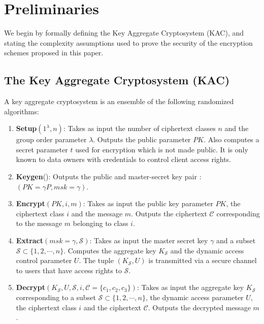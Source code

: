 \section{Preliminaries}
\label{sec:prelims}

We begin by formally defining the Key Aggregate Cryptosystem (KAC), and stating the complexity assumptions used to prove the security of the encryption schemes proposed in this paper.

\subsection{The Key Aggregate Cryptosystem (KAC)}
\label{subsec:KAC}

A key aggregate cryptosystem is an ensemble of the following randomized algorithms:

\begin{enumerate}
 \item \textbf{Setup}$(1^{\lambda},n)$: Takes as input the number of ciphertext classes $n$ and the group order parameter $\lambda$. Outputs the public parameter $PK$. Also computes a secret parameter $t$ used for encryption which is not made public. It is only known to data owners with credentials to control client access rights.  
 
 \item \textbf{Keygen}(): Outputs the public and master-secret key pair :\\ $(PK={\gamma}P,msk=\gamma)$.
 
 \item \textbf{Encrypt}$(PK,i,m)$: Takes as input the public key parameter $PK$, the ciphertext class $i$ and the message $m$. Outputs the ciphertext $\mathcal{C}$ corresponding to the message $m$ belonging to class $i$. 
 
 \item \textbf{Extract}$(msk=\gamma,\mathcal{S})$: Takes as input the master secret key $\gamma$ and a subset $\mathcal{S} \subset\{1,2,\cdots,n\}$. Computes the aggregate key $K_{\mathcal{S}}$ and the dynamic access control parameter $U$. The tuple $(K_{\mathcal{S}},U)$ is transmitted via a secure channel to users that have access rights to $\mathcal{S}$.
 
 \item \textbf{Decrypt}$(K_{\mathcal{S}}, U, \mathcal{S},i,\mathcal{C}=\{c_1,c_2,c_3\})$: Takes as input the aggregate key $K_{\mathcal{S}}$ corresponding to a subset $\mathcal{S} \subset\{1,2,\cdots,n\}$, the dynamic access parameter $U$, the ciphertext class $i$ and the ciphertext $\mathcal{C}$. Outputs the decrypted message $m$.
\end{enumerate}

